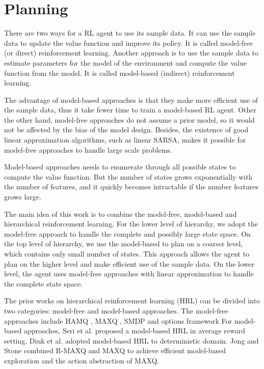 \chapter{Planning}
There are two ways for a RL agent to use its sample data. It can use the sample data to update the 
value function and improve its policy. It is called model-free (or direct) reinforcement learning. 
Another approach is to use the sample data to estimate parameters for the model of the environment and compute the value function
from the model. It is called model-based (indirect) reinforcement learning.

The advantage of model-based approaches is that they make more efficient use of the sample data, thus 
it take fewer time to train a model-based RL agent. Other the other hand, model-free approaches do not assume 
a prior model, so it would not be affected by the bias of the model design. Besides, the existence of 
good linear approximation algorithms, such as linear SARSA, makes it possible for model-free approaches to
handle large scale problems.

Model-based approaches needs to enumerate through all possible states to compute the value function. 
But the number of states grows exponentially with the number of features, 
and it quickly becomes intractable if the number features grows large.

The main idea of this work is to combine the model-free, model-based and hierarchical reinforcement learning.
For the lower level of hierarchy, we adopt the model-free approach to handle the complete and possibly large state space.
On the top level of hierarchy, we use the model-based to plan on a coarser level, which contains only small number of states.
This approach allows the agent to plan on the higher level and make efficient use of the sample data. On the lower level,
the agent uses model-free approaches with linear approximation to handle the complete state space.

The prior works on hierarchical reinforcement learning (HRL) can be divided into two categories: model-free and model-based approaches. 
The model-free approaches include HAMQ \cite{HAMQ}, MAXQ \cite{MAXQ}, SMDP and options framework \cite{option}
For model-based approaches, Seri et al. \cite{HLearning} proposed a model-based HRL in average reward setting.
Diuk et al. \cite{Diuk} adopted model-based HRL to deterministic domain. Jong and Stone \cite{RMaxQ} combined 
R-MAXQ and MAXQ to achieve efficient model-based exploration and the action abstraction of MAXQ.


